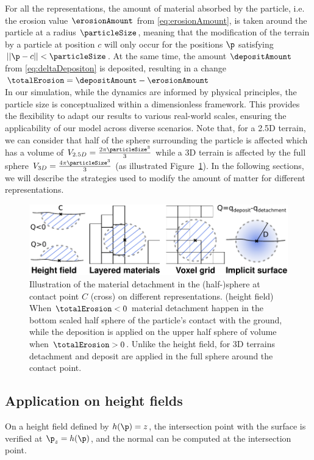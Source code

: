 For all the representations, the amount of material absorbed by the particle, i.e. the erosion value $\erosionAmount$ from \eqref{eq:erosionAmount}, is taken around the particle at a radius $\particleSize$, meaning that the modification of the terrain by a particle at position $c$ will only occur for the positions $\p$ satisfying $||\p - c|| < \particleSize$. At the same time, the amount $\depositAmount$ from \eqref{eq:deltaDepositon} is deposited, resulting in a change $\totalErosion = \depositAmount - \erosionAmount$\\ 
In our simulation, while the dynamics are informed by physical principles, the particle size is conceptualized within a dimensionless framework. This provides the flexibility to adapt our results to various real-world scales, ensuring the applicability of our model across diverse scenarios.
Note that, for a 2.5D terrain, we can consider that half of the sphere surrounding the particle is affected which has a volume of $V_{2.5D} = \frac{2 \pi \particleSize^3}{3}$ while a 3D terrain is affected by the full sphere $V_{3D} = \frac{4 \pi \particleSize^3}{3}$ (as illustrated  Figure~\ref{fig:erosion_erosion_heightfield}). In the following sections, we will describe the strategies used to modify the amount of matter for different representations. 
\begin{figure}
\centering
\includegraphics{a_erosion_deposition.pdf}
\caption{Illustration of the material detachment in the (half-)sphere at contact point $C$ (cross) on different representations. (height field) When $\totalErosion < 0$ material detachment happen in the bottom scaled half sphere of the particle's contact with the ground, while the deposition is applied on the upper half sphere of volume when $\totalErosion > 0$. Unlike the height field, for 3D terrains detachment and deposit are applied in the full sphere around the contact point.}
\label{fig:erosion_erosion_heightfield}

\end{figure}
\subsection{Application on height fields}
\label{sec:erosion_application_on_heightmaps}
On a height field defined by $h(\p) = z$, the intersection point with the surface is verified at $\p_z = h(\p)$, and the normal can be computed at the intersection point. 

